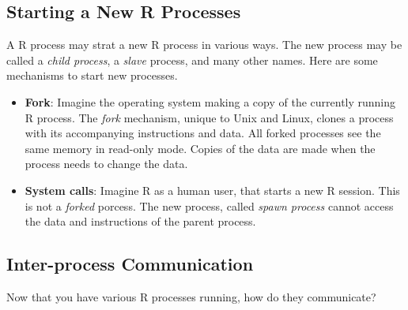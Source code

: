 \documentclass[]{book}
\theoremstyle{definition}
\theoremstyle{definition}
\theoremstyle{definition}
\theoremstyle{remark}
\begin{document}
\hypertarget{starting-a-new-r-processes}{%
\subsection{Starting a New R Processes}\label{starting-a-new-r-processes}}

A R process may strat a new R process in various ways.
The new process may be called a \emph{child process}, a \emph{slave} process, and many other names.
Here are some mechanisms to start new processes.

\begin{itemize}
\item
  \textbf{Fork}: Imagine the operating system making a copy of the currently running R process.
  The \emph{fork} mechanism, unique to Unix and Linux, clones a process with its accompanying instructions and data. All forked processes see the same memory in read-only mode. Copies of the data are made when the process needs to change the data.
\item
  \textbf{System calls}: Imagine R as a human user, that starts a new R session. This is not a \emph{forked} porcess. The new process, called \emph{spawn process} cannot access the data and instructions of the parent process.
\end{itemize}

\hypertarget{inter-process-communication}{%
\subsection{Inter-process Communication}\label{inter-process-communication}}

Now that you have various R processes running, how do they communicate?
\end{document}
